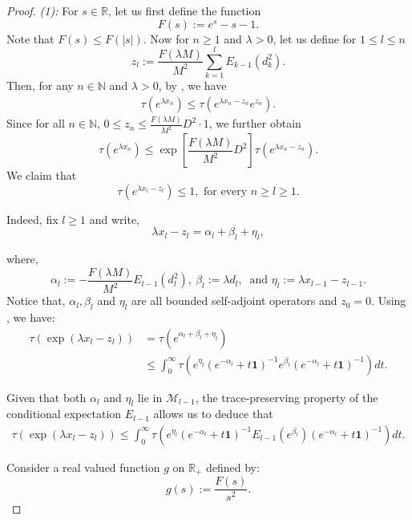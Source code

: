 \documentclass[10pt]{amsart}
\theoremstyle{definition}
\theoremstyle{myremark}
\numberwithin{equation}{section}
\def\N{\mathbb N}
\def\R{\mathbb R}
\newcommand{\CM}{\mathcal{M}}
\newcommand{\abs}[1]{\left\vert#1\right\vert}
\begin{document}
\begin{proof}
\emph{(1):} For $s \in \R$, let us first define the function 
\[
F(s):= e^s-s-1.
\] 
Note that $F(s) \leq F(\abs{s})$.
Now for $n \geq 1$ and $\lambda>0$, let us define for $1\leq l\leq n$
\[
z_l:= \frac{F(\lambda M)}{M^2} \sum_{k=1}^l E_{k-1} (d_k^2).
\]
Then, for any $n \in \N$ and $\lambda>0$, by , we have 
\begin{align*}
    \tau(e^{\lambda x_n}) \leq \tau(e^{\lambda x_n - z_n} e^{z_n}).
\end{align*}
Since for all $n \in \N$, $0\le z_n \leq \frac{F(\lambda M)}{M^2} D^2\cdot 1$, we further obtain
\[
\tau(e^{\lambda x_n}) \leq \exp \left[\frac{F(\lambda M)}{M^2} D^2 \right] \tau(e^{\lambda x_n - z_n}).
\]
We claim that 
\begin{equation}\label{eq: claim}
    \tau\left(e^{\lambda x_l - z_l}\right) \leq 1, \text{ for every } n\geq l\ge 1.
\end{equation}

 Indeed, fix $l\ge 1$ and write,
\begin{equation}
    \lambda x_l-z_l = \alpha_l +\beta_l+\eta_l,
\end{equation}

where,
$$\alpha_l:=-\frac{F(\lambda M)}{M^2} E_{l-1}\left(d_l^2\right), ~\beta_l:= \lambda  d_l,~\text{ and } \eta_l:=\lambda x_{l-1}-z_{l-1}.$$
Notice that, $\alpha_l,\beta_l$ and $\eta_l$ are all bounded self-adjoint operators and $z_0=0$. Using , we have:
\begin{align*}
    \tau\left(\exp\left(\lambda x_l-z_l\right)\right)&= \tau\left(e^{\alpha_l+\beta_l+\eta_l}\right)\\
    &\le \int_0^{\infty} \tau\left(e^{\eta_l}(e^{-\alpha_l} + t \mathbf{1})^{-1} e^{\beta_l}(e^{-\alpha_l} + t \mathbf{1})^{-1}\right) dt.
\end{align*}

Given that both $\alpha_l$ and $\eta_l$ lie in $\CM_{l-1}$, the trace-preserving property of the conditional expectation $E_{l-1}$ allows us to deduce that
\begin{align}
    \tau\left(\exp\left(\lambda x_l-z_l\right)\right)\le \int_0^{\infty} \tau\left(e^{\eta_l} (e^{-\alpha_l} + t\mathbf{1})^{-1} E_{l-1}(e^{\beta_l})(e^{-\alpha_l} + t\mathbf{1})^{-1} \right) dt. \label{eq: tau invariance ineq}
\end{align}

Consider a real valued function $g$ on $\R_+$ defined by:
$$g(s):=\frac{F(s)}{s^2}.$$


\end{proof}
\end{document}
